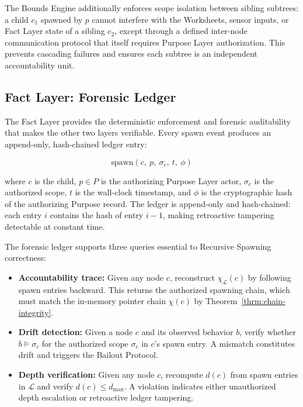 The Bounds Engine additionally enforces scope isolation between sibling subtrees: a child $c_1$ spawned by $p$ cannot interfere with the Worksheets, sensor inputs, or Fact Layer state of a sibling $c_2$, except through a defined inter-node communication protocol that itself requires Purpose Layer authorization. This prevents cascading failures and ensures each subtree is an independent accountability unit.

\subsection{Fact Layer: Forensic Ledger}
\label{sec:fact-ledger}

The Fact Layer provides the deterministic enforcement and forensic auditability that makes the other two layers verifiable. Every spawn event produces an append-only, hash-chained ledger entry:

\begin{equation}
\text{spawn}(c,\ p,\ \sigma_c,\ t,\ \phi)
\tag{3}
\end{equation}

where $c$ is the child, $p \in P$ is the authorizing Purpose Layer actor, $\sigma_c$ is the authorized scope, $t$ is the wall-clock timestamp, and $\phi$ is the cryptographic hash of the authorizing Purpose record. The ledger is append-only and hash-chained: each entry $i$ contains the hash of entry $i-1$, making retroactive tampering detectable at constant time.

The forensic ledger supports three queries essential to Recursive Spawning correctness:

\begin{itemize}
    \itemsep0em
    \item \textbf{Accountability trace:} Given any node $c$, reconstruct $\chi_{\mathcal{L}}(c)$ by following spawn entries backward. This returns the authorized spawning chain, which must match the in-memory pointer chain $\chi(c)$ by Theorem~\ref{thrm:chain-integrity}.
    \item \textbf{Drift detection:} Given a node $c$ and its observed behavior $b$, verify whether $b \models \sigma_c$ for the authorized scope $\sigma_c$ in $c$'s spawn entry. A mismatch constitutes drift and triggers the Bailout Protocol.
    \item \textbf{Depth verification:} Given any node $c$, recompute $d(c)$ from spawn entries in $\mathcal{L}$ and verify $d(c) \leq d_{\max}$. A violation indicates either unauthorized depth escalation or retroactive ledger tampering.
\end{itemize}


